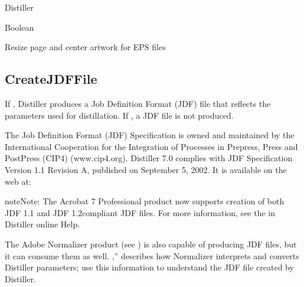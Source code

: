 \documentclass[letterpaper,12pt,english,openany,oneside]{sphinxmanual}
\begin{document}
\label{\detokenize{PDF_Create_CommonSettings:supported-by-89}}

Distiller

\label{\detokenize{PDF_Create_CommonSettings:type-88}}

Boolean

\label{\detokenize{PDF_Create_CommonSettings:ui-name-72}}

Resize page and center artwork for EPS files

\label{\detokenize{PDF_Create_CommonSettings:default-value-83}}

\begin{sphinxVerbatim}[commandchars=\\\{\}]
\end{sphinxVerbatim}




\subsection{CreateJDFFile}
\label{\detokenize{PDF_Create_CommonSettings:createjdffile}}
If  , Distiller produces a Job Definition Format (JDF) file that reflects the parameters used for distillation. If  , a JDF file is not produced.

The Job Definition Format (JDF) Specification is owned and maintained by the International Cooperation for the Integration of Processes in Prepress, Press and PostPress (CIP4) (www.cip4.org). Distiller 7.0 complies with JDF Specification Version 1.1 Revision A, published on September 5, 2002. It is available on the web at:


\begin{sphinxadmonition}{note}{Note:}
The Acrobat 7 Professional product now supports creation of both JDF 1.1\sphinxhyphen{} and JDF 1.2\sphinxhyphen{}compliant JDF files. For more information, see the  in Distiller online Help.
\end{sphinxadmonition}

The Adobe Normalizer product (see  ) is also capable of producing JDF files, but it can consume them as well. ,” describes how Normalizer interprets and converts Distiller parameters; use this information to understand the JDF file created by Distiller.
\end{document}
